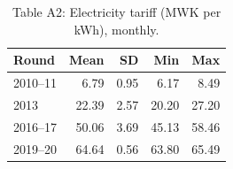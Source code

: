 \begin{table}[ht]
\centering
\caption{Table A2: Electricity tariff (MWK per kWh), monthly.} 
\label{tab:A2_electricity}
\begin{tabular}{lrrrr}
  \hline
Round & Mean & SD & Min & Max \\ 
  \hline
2010--11 & 6.79 & 0.95 & 6.17 & 8.49 \\ 
  2013 & 22.39 & 2.57 & 20.20 & 27.20 \\ 
  2016--17 & 50.06 & 3.69 & 45.13 & 58.46 \\ 
  2019--20 & 64.64 & 0.56 & 63.80 & 65.49 \\ 
   \hline
\end{tabular}
\end{table}
